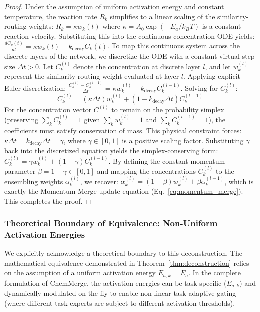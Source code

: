 \begin{proof}
Under the assumption of uniform activation energy and constant temperature, the reaction rate $R_k$ simplifies to a linear scaling of the similarity-routing weights: $R_k = \kappa w_k(t)$ where $\kappa = A_0 \exp\left(-E_a / k_B T\right)$ is a constant reaction velocity. Substituting this into the continuous concentration ODE yields: $\frac{d C_k(t)}{dt} = \kappa w_k(t) - k_{\text{decay}} C_k(t)$.
To map this continuous system across the discrete layers of the network, we discretize the ODE with a constant virtual step size $\Delta t > 0$. Let $C_k^{(l)}$ denote the concentration at discrete layer $l$, and let $w_k^{(l)}$ represent the similarity routing weight evaluated at layer $l$. Applying explicit Euler discretization: $\frac{C_k^{(l)} - C_k^{(l-1)}}{\Delta t} = \kappa w_k^{(l)} - k_{\text{decay}} C_k^{(l-1)}$.
Solving for $C_k^{(l)}$:
\begin{equation}
    C_k^{(l)} = (\kappa \Delta t) w_k^{(l)} + (1 - k_{\text{decay}} \Delta t) C_k^{(l-1)}
\end{equation}
For the concentration vector $C^{(l)}$ to remain on the probability simplex (preserving $\sum_k C_k^{(l)} = 1$ given $\sum_k w_k^{(l)} = 1$ and $\sum_k C_k^{(l-1)} = 1$), the coefficients must satisfy conservation of mass. This physical constraint forces: $\kappa \Delta t = k_{\text{decay}} \Delta t = \gamma$, where $\gamma \in [0, 1]$ is a positive scaling factor. Substituting $\gamma$ back into the discretized equation yields the simplex-conserving form: $C_k^{(l)} = \gamma w_k^{(l)} + (1 - \gamma) C_k^{(l-1)}$.
By defining the constant momentum parameter $\beta = 1 - \gamma \in [0, 1]$ and mapping the concentrations $C_k^{(l)}$ to the ensembling weights $\alpha_k^{(l)}$, we recover: $\alpha_k^{(l)} = (1 - \beta) w_k^{(l)} + \beta \alpha_k^{(l-1)}$, which is exactly the Momentum-Merge update equation (Eq.~\ref{eq:momentum_merge}). This completes the proof.
\end{proof}

\subsubsection{Theoretical Boundary of Equivalence: Non-Uniform Activation Energies}
We explicitly acknowledge a theoretical boundary to this deconstruction. The mathematical equivalence demonstrated in Theorem~\ref{thm:deconstruction} relies on the assumption of a uniform activation energy $E_{a, k} = E_a$. In the complete formulation of ChemMerge, the activation energies can be task-specific ($E_{a, k}$) and dynamically modulated on-the-fly to enable non-linear task-adaptive gating (where different task experts are subject to different activation thresholds). 

